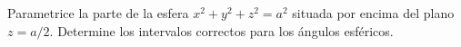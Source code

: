 Parametrice la parte de la esfera $x^2+y^2+z^2=a^2$ situada por encima del plano $z=a/2$. Determine los intervalos correctos para los ángulos esféricos.
